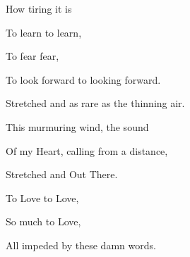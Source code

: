 \documentclass{article}
\begin{document}
\newline

How tiring it is
\newline

To learn to learn,
\newline

To fear fear,
\newline

To look forward to looking forward.
\newline

Stretched and as rare as the thinning air.
\newline

This murmuring wind, the sound
\newline

Of my Heart, calling from a distance,
\newline

Stretched and Out There.
\newline

To Love to Love,
\newline

So much to Love,
\newline

All impeded by these damn words.
\newline
\end{document}
